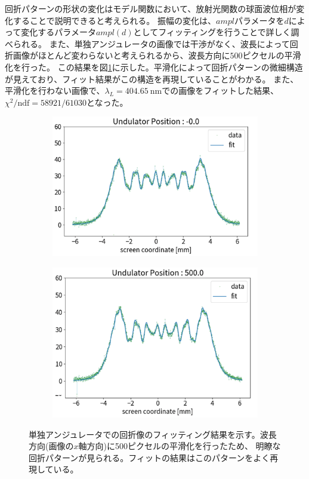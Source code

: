 \documentclass[a4paper,11pt,uplatex]{jsbook}
\begin{document}
回折パターンの形状の変化はモデル関数において、放射光関数の球面波位相が変化することで説明できると考えられる。
振幅の変化は、$ampl$パラメータを$d$によって変化するパラメータ$ampl(d)$としてフィッティングを行うことで詳しく調べられる。
また、単独アンジュレータの画像では干渉がなく、波長によって回折画像がほとんど変わらないと考えられるから、波長方向に$500$ピクセルの平滑化を行った。
この結果を図\ref{single_d}に示した。平滑化によって回折パターンの微細構造が見えており、フィット結果がこの構造を再現していることがわかる。
また、平滑化を行わない画像で、$\lambda_L =404.65~$nmでの画像をフィットした結果、$\chi^2/\text{ndf} = 58921/61030$となった。
\begin{figure}[H]
  \centering
  \begin{subfigure}[h]{0.45\linewidth}
    \centering
    \includegraphics[width=\linewidth]{image/4-single_0.png}
  \end{subfigure}
  \hfill
  \begin{subfigure}[h]{0.45\linewidth}
    \centering
    \includegraphics[width=\linewidth]{image/4-single_500.png}
  \end{subfigure}
  \caption[単独アンジュレータのデータ]{単独アンジュレータでの回折像のフィッティング結果を示す。波長方向(画像の$x$軸方向)に500ピクセルの平滑化を行ったため、
  明瞭な回折パターンが見られる。フィットの結果はこのパターンをよく再現している。}\label{single_d}
\end{figure}
\end{document}

